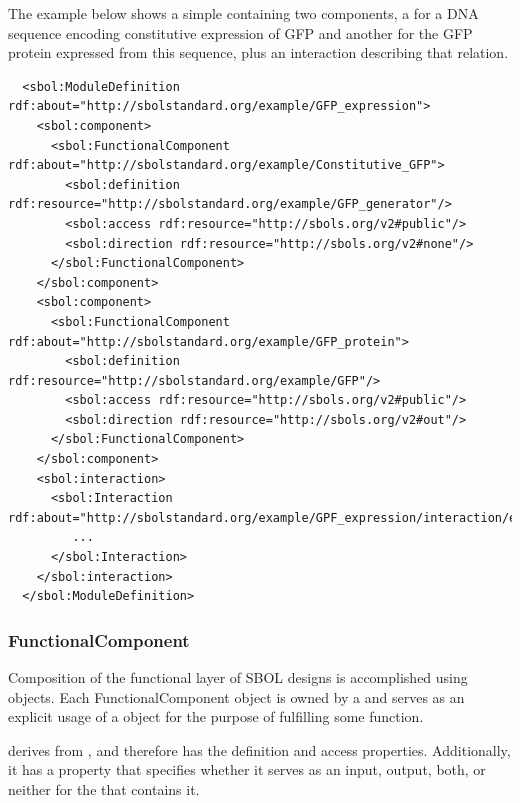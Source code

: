 
The example below shows a simple  containing two components, a  for a DNA sequence encoding constitutive expression of GFP and another for the GFP protein expressed from this sequence, plus an interaction describing that relation.

\begin{lstlisting}
  <sbol:ModuleDefinition rdf:about="http://sbolstandard.org/example/GFP_expression">
    <sbol:component>
      <sbol:FunctionalComponent rdf:about="http://sbolstandard.org/example/Constitutive_GFP">
        <sbol:definition rdf:resource="http://sbolstandard.org/example/GFP_generator"/>
        <sbol:access rdf:resource="http://sbols.org/v2#public"/>
        <sbol:direction rdf:resource="http://sbols.org/v2#none"/>
      </sbol:FunctionalComponent>
    </sbol:component>
    <sbol:component>
      <sbol:FunctionalComponent rdf:about="http://sbolstandard.org/example/GFP_protein">
        <sbol:definition rdf:resource="http://sbolstandard.org/example/GFP"/>
        <sbol:access rdf:resource="http://sbols.org/v2#public"/>
        <sbol:direction rdf:resource="http://sbols.org/v2#out"/>
      </sbol:FunctionalComponent>
    </sbol:component>
    <sbol:interaction>
      <sbol:Interaction rdf:about="http://sbolstandard.org/example/GPF_expression/interaction/express_GFP">
         ...
      </sbol:Interaction>
    </sbol:interaction>
  </sbol:ModuleDefinition>
\end{lstlisting}


\subsubsection{FunctionalComponent}
\label{sec:FunctionalComponent}
Composition of the functional layer of SBOL designs is accomplished using  objects. Each FunctionalComponent object is owned by a  and serves as an explicit usage of a  object for the purpose of fulfilling some function. 

 derives from , and therefore has the definition and access properties. Additionally, it has a  property that specifies whether it serves as an input, output, both, or neither for the  that contains it.


